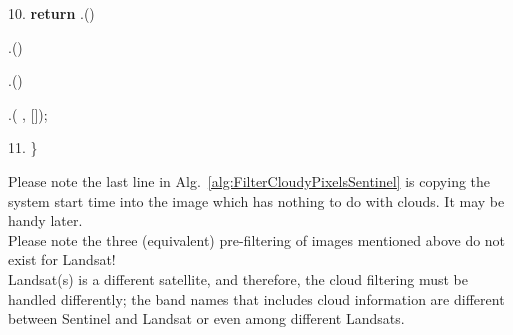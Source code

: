 \begin{tcolorbox}
\begin{algorithm}[H]
\hspace{.2in} 10. 
\textbf{return}
.()

\hspace{1.25in}
.()
                
\hspace{1.25in}
.()
                
\hspace{.4in} .(
                , []);
                
\hspace{.01in} 11. \}
\end{algorithm}
\end{tcolorbox}

\noindent \textbf{{\color{red}{Note 1:}}} Please note
the last line in Alg.~\ref{alg:FilterCloudyPixelsSentinel}
is copying the system start time into the image which
has nothing to do with clouds. It may be handy later.\\


\noindent \textbf{{\color{red}{Note 2:}}} Please note
the three (equivalent) pre-filtering of images mentioned 
above do not exist for Landsat!\\

Landsat(s) is a different satellite, and 
therefore, the cloud filtering must 
be handled
differently; the band names that includes 
cloud information are different 
between Sentinel and
Landsat or even among different Landsats.\\

